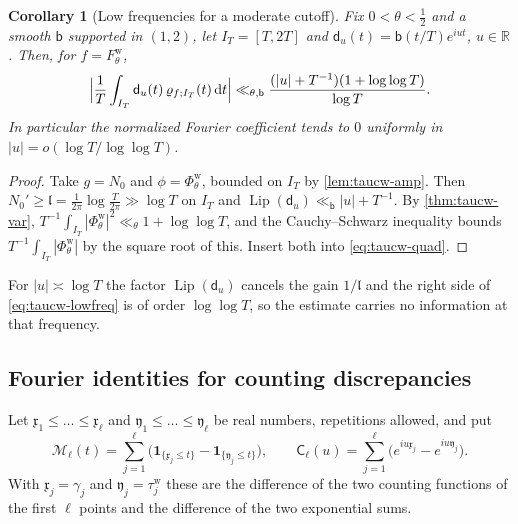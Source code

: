 \documentclass[11pt,a4paper]{article}
\numberwithin{equation}{section}
\newtheorem{corollary}[theorem]{Corollary}
\theoremstyle{definition}
\theoremstyle{remark}
\newcommand{\ind}{\mathbf 1}
\newcommand{\dd}{\,\mathrm dt}
\begin{document}
\begin{corollary}[Low frequencies for a moderate cutoff]\label{cor:taucw-lowfreq}
Fix $0<\theta<\frac12$ and a smooth $\mathsf b$ supported in $(1,2)$, let $I_T=[T,2T]$ and $\mathsf d_u(t)=\mathsf b(t/T)e^{iut}$, $u\in\mathbb R$. Then, for $f=F^{\mathrm w}_\theta$,
\begin{equation}\label{eq:taucw-lowfreq}
\Bigl|\frac1T\int_{I_T}\mathsf d_u(t)\,\varrho_{f;I_T}(t)\dd\Bigr|\ll_{\theta,\mathsf b}\frac{(|u|+T^{-1})(1+\log\log T)}{\log T}.
\end{equation}
In particular the normalized Fourier coefficient tends to $0$ uniformly in $|u|=o(\log T/\log\log T)$.
\end{corollary}
\begin{proof}
Take $g=N_0$ and $\phi=\Phi^{\mathrm w}_\theta$, bounded on $I_T$ by \cref{lem:taucw-amp}. Then $N_0'\ge\mathfrak l=\frac1{2\pi}\log\frac T{2\pi}\gg\log T$ on $I_T$ and $\operatorname{Lip}(\mathsf d_u)\ll_{\mathsf b}|u|+T^{-1}$. By \cref{thm:taucw-var}, $T^{-1}\int_{I_T}|\Phi^{\mathrm w}_\theta|^2\ll_\theta1+\log\log T$, and the Cauchy--Schwarz inequality bounds $T^{-1}\int_{I_T}|\Phi^{\mathrm w}_\theta|$ by the square root of this. Insert both into \eqref{eq:taucw-quad}.
\end{proof}
For $|u|\asymp\log T$ the factor $\operatorname{Lip}(\mathsf d_u)$ cancels the gain $1/\mathfrak l$ and the right side of \eqref{eq:taucw-lowfreq} is of order $\log\log T$, so the estimate carries no information at that frequency.

\subsection{Fourier identities for counting discrepancies}\label{sec:taucw-plancherel}
Let $\mathfrak x_1\le\dots\le\mathfrak x_\ell$ and $\mathfrak y_1\le\dots\le\mathfrak y_\ell$ be real numbers, repetitions allowed, and put
\begin{equation}\label{eq:taucw-M}
\mathscr M_\ell(t)=\sum_{j=1}^\ell\bigl(\ind_{\{\mathfrak x_j\le t\}}-\ind_{\{\mathfrak y_j\le t\}}\bigr),\qquad
\mathsf C_\ell(u)=\sum_{j=1}^\ell\bigl(e^{iu\mathfrak x_j}-e^{iu\mathfrak y_j}\bigr).
\end{equation}
With $\mathfrak x_j=\gamma_j$ and $\mathfrak y_j=\tau_j^{\mathrm w}$ these are the difference of the two counting functions of the first $\ell$ points and the difference of the two exponential sums.
\end{document}
